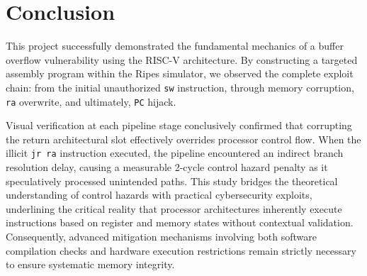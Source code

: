\chapter{Conclusion}

This project successfully demonstrated the fundamental mechanics of a buffer overflow vulnerability using the RISC-V architecture. By constructing a targeted assembly program within the Ripes simulator, we observed the complete exploit chain: from the initial unauthorized \texttt{sw} instruction, through memory corruption, \texttt{ra} overwrite, and ultimately, \texttt{PC} hijack. 

Visual verification at each pipeline stage conclusively confirmed that corrupting the return architectural slot effectively overrides processor control flow. When the illicit \texttt{jr ra} instruction executed, the pipeline encountered an indirect branch resolution delay, causing a measurable 2-cycle control hazard penalty as it speculatively processed unintended paths. This study bridges the theoretical understanding of control hazards with practical cybersecurity exploits, underlining the critical reality that processor architectures inherently execute instructions based on register and memory states without contextual validation. Consequently, advanced mitigation mechanisms involving both software compilation checks and hardware execution restrictions remain strictly necessary to ensure systematic memory integrity.
